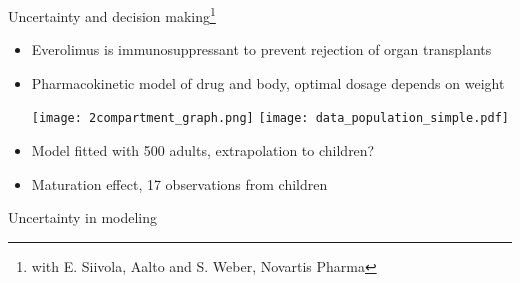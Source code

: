 \documentclass[english,t]{beamer}
\begin{document}
\begin{frame}{Uncertainty and decision making\footnote{\color{gray}with E. Siivola, Aalto and S. Weber, Novartis Pharma}}

  \vspace{-0.5\baselineskip}
\begin{itemize}
\item Everolimus is immunosuppressant to prevent rejection of organ
  transplants
\item Pharmacokinetic model of drug and body, optimal dosage depends on weight\\
  \begin{minipage}[t]{\textwidth}
    \vspace{-.2\baselineskip}
  \hspace{-1.2cm}\texttt{[image: 2compartment\_graph.png]}
  \texttt{[image: data\_population\_simple.pdf]}
\end{minipage}
    \vspace{.2\baselineskip}
\item<2-> Model fitted with 500 adults, extrapolation to children?
\item<3-> Maturation effect, 17 observations from children
\end{itemize}

\end{frame}

\begin{frame}{Uncertainty in modeling}

  

\end{frame}


\end{document}
